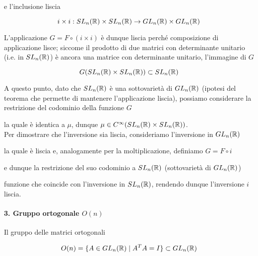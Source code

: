 
e l'inclusione liscia

\begin{equation}
	i \times i : SL_{n}(\mathbb{R}) \times SL_{n}(\mathbb{R}) \to GL_{n}(\mathbb{R}) \times GL_{n}(\mathbb{R})
\end{equation}

L'applicazione $ G = F \circ (i \times i) $ è dunque liscia perché composizione di applicazione lisce; siccome il prodotto di due matrici con determinante unitario (i.e. in $ SL_{n}(\mathbb{R}) $) è ancora una matrice con determinante unitario, l'immagine di $ G $

\begin{equation}
	G(SL_{n}(\mathbb{R}) \times SL_{n}(\mathbb{R})) \subset SL_{n}(\mathbb{R})
\end{equation}

A questo punto, dato che $ SL_{n}(\mathbb{R}) $ è una sottovarietà di $ GL_{n}(\mathbb{R}) $ (ipotesi del teorema che permette di mantenere l'applicazione liscia), possiamo considerare la restrizione del codominio della funzione $ G $


la quale è identica a $ \mu $, dunque $ \mu \in C^{\infty}(SL_{n}(\mathbb{R}) \times SL_{n}(\mathbb{R})) $.\\
Per dimostrare che l'inversione sia liscia, consideriamo l'inversione in $ GL_{n}(\mathbb{R}) $


la quale è liscia e, analogamente per la moltiplicazione, definiamo $ G = F \circ i $


e dunque la restrizione del suo codominio a $ SL_{n}(\mathbb{R}) $ (sottovarietà di $ GL_{n}(\mathbb{R}) $)


funzione che coincide con l'inversione in $ SL_{n}(\mathbb{R}) $, rendendo dunque l'inversione  $ i $ liscia.

\paragraph{3. Gruppo ortogonale $ O(n) $}

Il gruppo delle matrici ortogonali

\begin{equation}
	O(n) = \{ A \in GL_{n}(\mathbb{R}) \mid A^{T} A = I \} \subset GL_{n}(\mathbb{R})
\end{equation}

